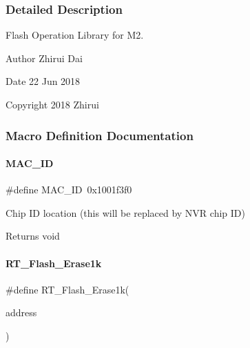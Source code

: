 \subsubsection{Detailed Description}
Flash Operation Library for M2. 

\begin{DoxyAuthor}{Author}
Zhirui Dai 
\end{DoxyAuthor}
\begin{DoxyDate}{Date}
22 Jun 2018 
\end{DoxyDate}
\begin{DoxyCopyright}{Copyright}
2018 Zhirui 
\end{DoxyCopyright}


\subsubsection{Macro Definition Documentation}
\mbox{\label{a00008_aca69c626499ce2e479703cc526dba84d}} 
\paragraph{\texorpdfstring{M\+A\+C\+\_\+\+ID}{MAC\_ID}}
{\footnotesize\ttfamily \#define M\+A\+C\+\_\+\+ID~0x1001f3f0}



Chip ID location (this will be replaced by N\+VR chip ID) 

\begin{DoxyReturn}{Returns}
void 
\end{DoxyReturn}
\mbox{\label{a00008_ab65db3c66c91da3a934540a2f8175803}} 
\paragraph{\texorpdfstring{R\+T\+\_\+\+Flash\+\_\+\+Erase1k}{RT\_Flash\_Erase1k}}
{\footnotesize\ttfamily \#define R\+T\+\_\+\+Flash\+\_\+\+Erase1k(\begin{DoxyParamCaption}\item[{}]{address }\end{DoxyParamCaption})}

